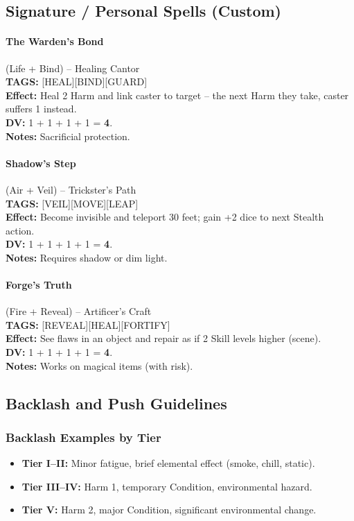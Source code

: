 \subsection{Signature / Personal Spells (Custom)}

\paragraph{The Warden's Bond} (Life + Bind) -- Healing Cantor \\
\textbf{TAGS:} {[HEAL][BIND][GUARD]} \\
\textbf{Effect:} Heal 2 Harm and link caster to target -- the next Harm they take, caster suffers 1 instead. \\
\textbf{DV:} 1 + 1 + 1 + 1 = \textbf{4}. \\
\textbf{Notes:} Sacrificial protection.

\paragraph{Shadow's Step} (Air + Veil) -- Trickster's Path \\
\textbf{TAGS:} {[VEIL][MOVE][LEAP]} \\
\textbf{Effect:} Become invisible and teleport 30 feet; gain +2 dice to next Stealth action. \\
\textbf{DV:} 1 + 1 + 1 + 1 = \textbf{4}. \\
\textbf{Notes:} Requires shadow or dim light.

\paragraph{Forge's Truth} (Fire + Reveal) -- Artificer's Craft \\
\textbf{TAGS:} {[REVEAL][HEAL][FORTIFY]} \\
\textbf{Effect:} See flaws in an object and repair as if 2 Skill levels higher (scene). \\
\textbf{DV:} 1 + 1 + 1 + 1 = \textbf{4}. \\
\textbf{Notes:} Works on magical items (with risk).

\subsection{Backlash and Push Guidelines}

\subsubsection{Backlash Examples by Tier}
\begin{itemize}
    \item \textbf{Tier I--II:} Minor fatigue, brief elemental effect (smoke, chill, static).
    \item \textbf{Tier III--IV:} Harm 1, temporary Condition, environmental hazard.
    \item \textbf{Tier V:} Harm 2, major Condition, significant environmental change.
\end{itemize}

